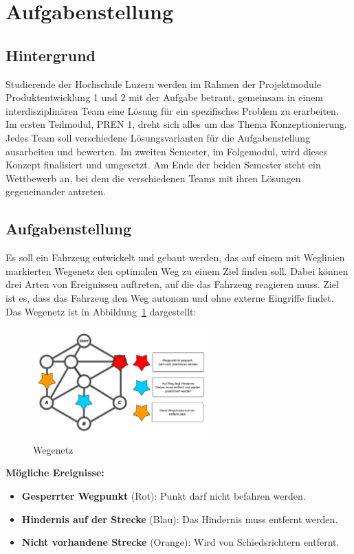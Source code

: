 \documentclass[../main.tex]{subfiles}
\begin{document}
\section{Aufgabenstellung}

\subsection{Hintergrund}

Studierende der Hochschule Luzern werden im Rahmen der Projektmodule
Produktentwicklung 1 und 2 mit der Aufgabe betraut, gemeinsam in einem
interdisziplinären Team eine Lösung für ein spezifisches Problem zu erarbeiten.
Im ersten Teilmodul, PREN 1, dreht sich alles um das Thema Konzeptionierung.
Jedes Team soll verschiedene Lösungsvarianten für die Aufgabenstellung
ausarbeiten und bewerten. Im zweiten Semester, im Folgemodul, wird dieses
Konzept finalisiert und umgesetzt. Am Ende der beiden Semester steht ein
Wettbewerb an, bei dem die verschiedenen Teams mit ihren Lösungen gegeneinander
antreten.

\subsection{Aufgabenstellung}

Es soll ein Fahrzeug entwickelt und gebaut werden, das auf einem mit Weglinien
markierten Wegenetz den optimalen Weg zu einem Ziel finden soll. Dabei können
drei Arten von Ereignissen auftreten, auf die das Fahrzeug reagieren muss. Ziel
ist es, dass das Fahrzeug den Weg autonom und ohne externe Eingriffe findet.
Das Wegenetz ist in Abbildung~\ref{fig:wegenetz} dargestellt:

\begin{figure}[h!]
    \centering
    \includegraphics[width=0.6\textwidth]{./resources/Abbildung_Wegenetz.pdf}
    \caption{Wegenetz}
    \label{fig:wegenetz}
\end{figure}

\textbf{Mögliche Ereignisse:}
\begin{itemize}
    \item \textbf{Gesperrter Wegpunkt} (Rot): Punkt darf nicht befahren werden.
    \item \textbf{Hindernis auf der Strecke} (Blau): Das Hindernis muss entfernt werden.
    \item \textbf{Nicht vorhandene Strecke} (Orange): Wird von Schiedsrichtern entfernt.
\end{itemize}
\end{document}
